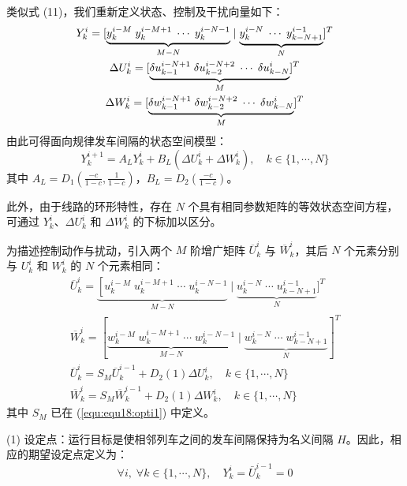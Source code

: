 类似式 (11)，我们重新定义状态、控制及干扰向量如下：
\begin{gather}
	Y_{k}^{i}=[\underbrace{y_{k}^{i-M} \; y_{k}^{i-M+1} \; \cdots \; y_{k}^{i-N-1}}_{M-N} \mid \underbrace{y_{k}^{i-N} \; \cdots \; y_{k-N+1}^{i-1}}_{N}]^{T} \notag\\
	\Delta U_{k}^{i}=[\underbrace{\delta u_{k-1}^{i-N+1} \; \delta u_{k-2}^{i-N+2} \; \cdots \; \delta u_{k-N}^{i}}_{M}]^{T} \notag\\
	\Delta W_{k}^{i}=[\underbrace{\delta w_{k-1}^{i-N+1} \; \delta w_{k-2}^{i-N+2} \; \cdots \; \delta w_{k-N}^{i}}_{M}]^{T}
\end{gather}
由此可得面向规律发车间隔的状态空间模型：
\begin{equation}
	Y_{k}^{i+1}=A_{L} Y_{k}^{i}+B_{L}\left(\Delta U_{k}^{i}+\Delta W_{k}^{i}\right), \quad k \in\{1, \cdots, N\}
	\label{equ:equ25:model2}
\end{equation}
其中 $A_{L}=D_{1}\left(\frac{-c}{1-c}, \frac{1}{1-c}\right)$，$B_{L}=D_{2}\left(\frac{-c}{1-c}\right)$。

此外，由于线路的环形特性，存在 $N$ 个具有相同参数矩阵的等效状态空间方程，可通过 $Y_k^i$、$\Delta U_k^i$ 和 $\Delta W_k^i$ 的下标加以区分。

为描述控制动作与扰动，引入两个 $M$ 阶增广矩阵 ${\overline{U}}_k^i$ 与 ${\overline{W}}_k^i$，其后 $N$ 个元素分别与 $U_{k}^{i}$ 和 $W_{k}^{i}$ 的 $N$ 个元素相同：
\begin{gather}
	\overline{U}_{k}^{i}=\underbrace{\left[u_{k}^{i-M} \; u_{k}^{i-M+1} \; \cdots \; u_{k}^{i-N-1}\right.}_{M-N} \mid \underbrace{u_{k}^{i-N} \; \cdots \; u_{k-N+1}^{i-1}}_{N}]^{T}\\ 
	\overline{W}_{k}^{i}=[\underbrace{w_{k}^{i-M} \; w_{k}^{i-M+1} \; \cdots \; w_{k}^{i-N-1}}_{M-N} \mid \underbrace{w_{k}^{i-N} \; \cdots \; w_{k-N+1}^{i-1}}_{N}]^{T}\\ 
	\overline{U}_{k}^{i}=S_{M} \overline{U}_{k}^{i-1}+D_{2}(1) \Delta U_{k}^{i}, \quad k \in\{1, \cdots, N\}\\
	\overline{W}_{k}^{i}=S_{M} \overline{W}_{k}^{i-1}+D_{2}(1) \Delta W_{k}^{i}, \quad k \in\{1, \cdots, N\} \label{equ:equ29:wk}
\end{gather}
其中 $S_M$ 已在 (\ref{equ:equ18:opti1}) 中定义。

(1) 设定点：运行目标是使相邻列车之间的发车间隔保持为名义间隔 $H$。因此，相应的期望设定点定义为：
\begin{equation}
	\forall i, \; \forall k \in\{1, \cdots, N\}, \quad Y_{k}^{i}=\bar{U}_{k}^{i-1}=0
\end{equation}

